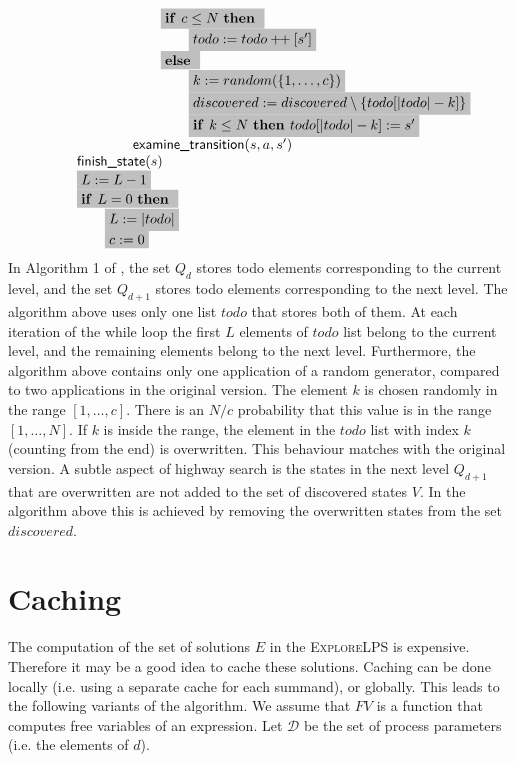 \documentclass{article}
\newcommand{\concat}{\ensuremath{+\!\!+\:}}
\newcommand{\If}{\text{\textbf{if }}}
\newcommand{\Then}{\text{\textbf{then }}}
\newcommand{\Else}{\text{\textbf{else }}}
\begin{document}
\[\begin{tabular}{l}
\qquad \qquad \qquad \qquad \colorbox{lightgray}{\If $c \leq N$ \Then} \\
\qquad \qquad \qquad \qquad \qquad \colorbox{lightgray}{$todo := todo \concat [s']$} \\
\qquad \qquad \qquad \qquad \colorbox{lightgray}{\Else} \\
\qquad \qquad \qquad \qquad \qquad \colorbox{lightgray}{$k := random(\{ 1, \ldots, c\})$} \\
\qquad \qquad \qquad \qquad \qquad \colorbox{lightgray}{$discovered := discovered \setminus \{todo[|todo| - k]\}$} \\
\qquad \qquad \qquad \qquad \qquad \colorbox{lightgray}{\If $k \leq N$ \Then $todo[|todo| - k] := s'$} \\
\qquad \qquad \qquad $\textsf{examine\_transition}(s, a, s')$ \\
\qquad $\textsf{finish\_state}(s)$ \\
\qquad \colorbox{lightgray}{$L := L - 1$} \\
\qquad \colorbox{lightgray}{\If $L = 0$ \Then} \\
\qquad \qquad \colorbox{lightgray}{$L := |todo|$} \\
\qquad \qquad \colorbox{lightgray}{$c := 0$}
\end{tabular}
\]
In Algorithm 1 of \cite{DBLP:journals/jlp/EngelsGWW09}, the set $Q_d$ stores todo elements corresponding to the current level, and the set $Q_{d+1}$ stores todo elements corresponding to the next level. The algorithm above uses only one list $todo$ that stores both of them. At each iteration of the while loop the first $L$ elements of $todo$ list belong to the current level, and the remaining elements belong to the next level. Furthermore, the algorithm above contains only one application of a random generator, compared to two applications in the original version. The element $k$ is chosen randomly in the range $[1, \ldots, c]$. There is an $N/c$ probability that this value is in the range $[1, \ldots, N]$. If $k$ is inside the range, the element in the $todo$ list with index $k$ (counting from the end) is overwritten. This behaviour matches with the original version.
A subtle aspect of highway search is the states in the next level $Q_{d+1}$ that are overwritten are not added to the set of discovered states $V$. In the algorithm above this is achieved by removing the overwritten states from the set $discovered$.

\newpage
\section{Caching}
The computation of the set of solutions $E$ in the \textsc{ExploreLPS} is expensive. Therefore it may be a good idea to cache these solutions. Caching can be done locally (i.e. using a separate cache for each summand),
or globally. This leads to the following variants of the algorithm. We assume that $FV$ is a function that
computes free variables of an expression. Let $\mathcal{D}$ be the set of process parameters
(i.e. the elements of $d$).
\end{document}
